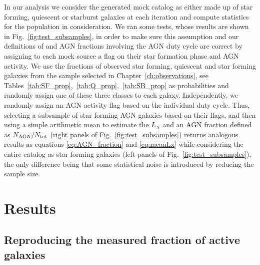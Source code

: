 In our analysis we consider the generated mock catalog as either made up of star forming, quiescent or starburst galaxies at each iteration and compute statistics for the population in consideration. We ran some tests, whose results are shown in Fig.~\ref{fig:test_subsamples}, in order to make sure this assumption and our definitions of \LX{} and AGN fractions involving the AGN duty cycle are correct by assigning to each mock source a flag on their star formation phase and AGN activity. We use the fractions of observed star forming, quiescent and star forming galaxies from the sample selected in Chapter~\ref{ch:observations}, see Tables~\ref{tab:SF_prop},~\ref{tab:Q_prop},~\ref{tab:SB_prop} as probabilities and randomly assign one of these three classes to each galaxy. Independently, we randomly assign an AGN activity flag based on the individual duty cycle. Thus, selecting a subsample of star forming AGN galaxies based on their flags, and then using a simple arithmetic mean to estimate the $\overline{L_X}$ and an AGN fraction defined as $N_{\rm AGN}/N_{\rm tot}$ (right panels of Fig.~\ref{fig:test_subsamples}) returns analogous results as equations \ref{eq:AGN_fraction} and \ref{eq:meanLx} while considering the entire catalog as star forming galaxies (left panels of Fig.~\ref{fig:test_subsamples}), the only difference being that some statistical noise is introduced by reducing the sample size.

\section{Results}\label{sec:results}

\subsection{Reproducing the measured fraction of active galaxies} \label{ssec:Fig1}

